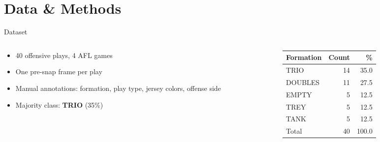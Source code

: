\documentclass[9pt,aspectratio=169]{beamer}
\begin{document}
\section{Data \& Methods}

\begin{frame}{Dataset}
  \begin{columns}[T]
    \begin{column}{0.55\textwidth}
      \small
      \begin{itemize}
        \item 40 offensive plays, 4 AFL games
        \item One pre-snap frame per play
        \item Manual annotations: formation, play type, jersey colors, offense side
        \item Majority class: \textbf{TRIO} (35\%)
      \end{itemize}
    \end{column}
    \begin{column}{0.45\textwidth}
      \centering
      \small
      \renewcommand{\arraystretch}{1.0}
      \begin{tabular}{lrr}
        \toprule
        \textbf{Formation} & \textbf{Count} & \textbf{\%} \\
        \midrule
        TRIO    & 14 & 35.0 \\
        DOUBLES & 11 & 27.5 \\
        EMPTY   &  5 & 12.5 \\
        TREY    &  5 & 12.5 \\
        TANK    &  5 & 12.5 \\
        \midrule
        Total   & 40 & 100.0 \\
        \bottomrule
      \end{tabular}
    \end{column}
  \end{columns}
\end{frame}
\end{document}
